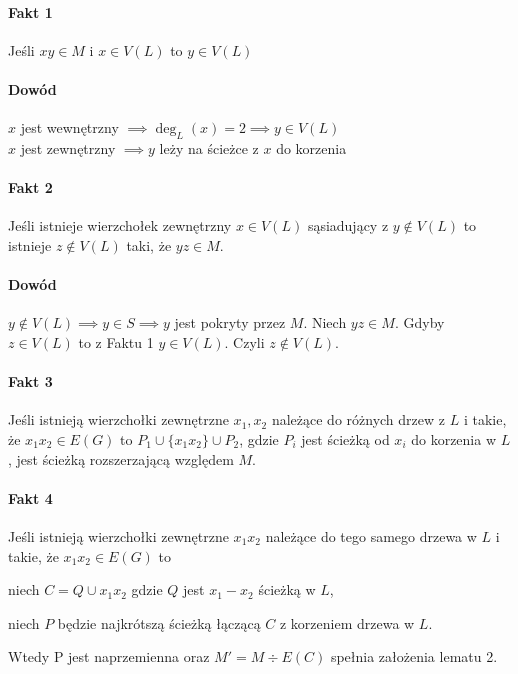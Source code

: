 \paragraph{Fakt 1}
Jeśli $xy \in M$ i $x \in V(L)$ to $y \in V(L)$
\paragraph{Dowód}
$x$ jest wewnętrzny $\implies \deg_L(x) = 2 \implies y \in V(L)$ \\
$x$ jest zewnętrzny $\implies y$ leży na ścieżce z $x$ do korzenia

\paragraph{Fakt 2}
Jeśli istnieje wierzchołek zewnętrzny $x \in V(L)$ sąsiadujący z $y \not\in V(L)$ to istnieje $z \not\in V(L)$ taki, że $yz \in M$.
\paragraph{Dowód}
$y \not\in V(L) \implies y \in S \implies y$ jest pokryty przez $M$. Niech $yz \in M$. 
Gdyby $z \in V(L)$ to z Faktu 1 $y \in V(L)$. Czyli $z \not\in V(L)$.

\paragraph{Fakt 3}
Jeśli istnieją wierzchołki zewnętrzne $x_1, x_2$ należące do różnych drzew z $L$ i takie, że $x_1x_2 \in E(G)$ to $P_1 \cup \{x_1x_2\} \cup P_2$, gdzie $P_i$ jest ścieżką od $x_i$ do korzenia w $L$, jest ścieżką rozszerzającą względem $M$.


\paragraph{Fakt 4}
Jeśli istnieją wierzchołki zewnętrzne $x_1x_2$ należące do tego samego drzewa w $L$ i takie, że $x_1x_2 \in E(G)$ to 

niech $C = Q \cup {x_1x_2}$ gdzie $Q$ jest $x_1 - x_2$ ścieżką w $L$,

niech $P$ będzie najkrótszą ścieżką łączącą $C$ z korzeniem drzewa w $L$.

Wtedy P jest naprzemienna oraz $M' = M \div E(C)$ spełnia założenia lematu 2.





